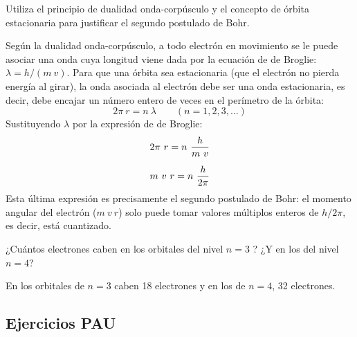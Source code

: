 \begin{question}
    Utiliza el principio de dualidad onda-corpúsculo y el concepto de órbita estacionaria para justificar el segundo
    postulado de Bohr.
    \begin{solu}
        Según la dualidad onda-corpúsculo, a todo electrón en movimiento se le puede asociar una onda cuya longitud viene dada por la ecuación de de Broglie: \(\lambda = h/(m\ v)\).
        Para que una órbita sea estacionaria (que el electrón no pierda energía al girar), la onda asociada al electrón debe ser una onda estacionaria, es decir, debe encajar un número entero de veces en el perímetro de la órbita:
        \begin{equation*}
            2\pi\ r = n\ \lambda \qquad (n = 1, 2, 3, \ldots)
        \end{equation*}
        Sustituyendo \(\lambda\) por la expresión de de Broglie:
        \begin{gather*}
            2\pi\ r = n\ \dfrac{h}{m\ v}\separ
            m\ v\ r = n\ \dfrac{h}{2\pi}
        \end{gather*}
        Esta última expresión es precisamente el segundo postulado de Bohr: el momento angular del electrón (\(m\ v\ r\)) solo puede tomar valores múltiplos enteros de \(h/2\pi\), es decir, está cuantizado.
    \end{solu}
\end{question}

\begin{question}
    ¿Cuántos electrones caben en los orbitales del nivel \(n = 3\) ? ¿Y en los del nivel \(n = 4\)?
    \begin{solu}
        En los orbitales de \( n = 3\) caben 18 electrones y en los de \(n = 4\), 32 electrones.
    \end{solu}
\end{question}

\subsection{Ejercicios PAU}\label{subsec:ejercicios-evau-clm}

